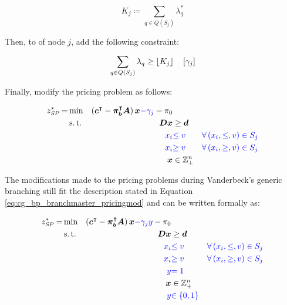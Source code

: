 \begin{equation}
K_j \coloneqq \sum_{q \in Q(S_j)} \lambda_q^*
\end{equation}

Then, to \RMP{} of node $j$, add the following constraint:

\begin{equation}
\sum_{q \in Q(S_j)} \lambda_q \geq \lfloor K_j\rfloor \quad \left[\gamma_j\right]
\end{equation}

Finally, modify the pricing problem as follows:

\begin{equation}
\begin{aligned}
z^*_\SP{} = &\min & \left( \vec{c}\transpose - \vec{\pi}_\vec{b}\transpose \mat{A} \right) \vec{x} {\color{blue} - \gamma_j} - \pi_0 & \\
&\st & \mat{D} \vec{x} & \geq \vec{d} \\
&& {\color{blue} x_i} & {\color{blue} \leq v} & {\color{blue} \forall \left( x_i, \leq, v \right) \in S_j} \\
&& {\color{blue} x_i} & {\color{blue} \geq v} & {\color{blue} \forall \left( x_i, \geq, v \right) \in S_j} \\
&& \vec{x} & \in \mathbb{Z}_+^n
\end{aligned}
\end{equation}

\begin{note}
The modifications made to the pricing problems during Vanderbeck's generic branching still fit the description stated in Equation \eqref{eq:cg_bp_branchmaster_pricingmod} and can be written formally as:

\begin{equation}
\begin{aligned}
z^*_\SP{} = &\min & \left( \vec{c}\transpose - \vec{\pi}_\vec{b}\transpose \mat{A} \right) \vec{x} {\color{blue} - \gamma_j y} - \pi_0 & \\
&\st & \mat{D} \vec{x} & \geq \vec{d} \\
&& {\color{blue} x_i} & {\color{blue} \leq v} & {\color{blue} \forall \left( x_i, \leq, v \right) \in S_j} \\
&& {\color{blue} x_i} & {\color{blue} \geq v} & {\color{blue} \forall \left( x_i, \geq, v \right) \in S_j} \\
&& {\color{blue} y} & {\color{blue} = 1} \\
&& \vec{x} & \in \mathbb{Z}_+^n \\
&& {\color{blue} y} & {\color{blue} \in \{0, 1\}}
\end{aligned}
\end{equation}
\end{note}


